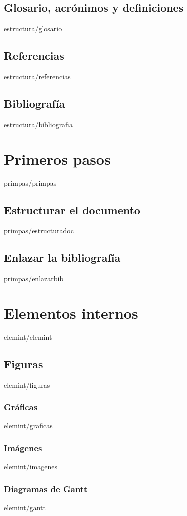 \documentclass[epsbased,copyright,final,printable,covers,extendedindex,firstnumbered,tfg,gnuplot]{tfgtfmthesisuam}
\begin{document}
  \section[Glosario, acrónimos y definiciones]{Glosario, acrónimos y definiciones\label{SEC:GLOSARIO}}{estructura/glosario}
  \section{Referencias\label{SEC:REFERENCIAS}}{estructura/referencias}
  \section{Bibliografía\label{SEC:BIBLIOGRAFIA}}{estructura/bibliografia}

\chapter{Primeros pasos\label{CAP:PRIMEROSPASOS}}{primpas/primpas}
  \section{Estructurar el documento\label{SEC:ESTRUCTURAR}}{primpas/estructuradoc}
  \section{Enlazar la bibliografía\label{SEC:ENLAZBIBLIOGRAFIA}}{primpas/enlazarbib}

\chapter{Elementos internos\label{CAP:ELEMINT}}{elemint/elemint}
  \section{Figuras\label{SEC:FIGURAS}}{elemint/figuras}
    \subsection{Gráficas\label{SS:GRAFICAS}}{elemint/graficas}
    \subsection{Imágenes\label{SS:INMAGENES}}{elemint/imagenes}
    \subsection{Diagramas de Gantt\label{SS:GANTT}}{elemint/gantt}
\end{document}
